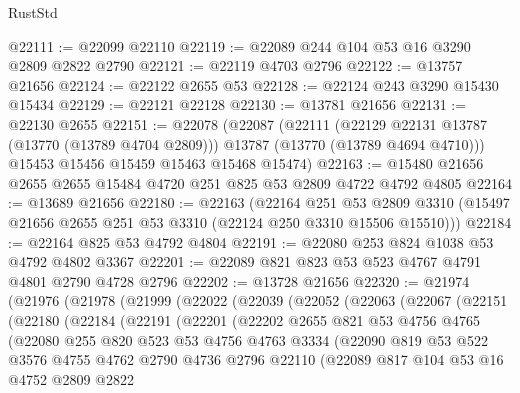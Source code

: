 \begin{lexlean}{RustStd}
\begin{coremodule}
@22111 := @22099 @22110
@22119 := @22089 @244 @104 @53 @16 @3290 @2809 @2822 @2790
@22121 := @22119 @4703 @2796
@22122 := @13757 @21656
@22124 := @22122 @2655 @53
@22128 := @22124 @243 @3290 @15430 @15434
@22129 := @22121 @22128
@22130 := @13781 @21656
@22131 := @22130 @2655
@22151 := @22078
    (@22087
      (@22111
        (@22129 @22131 @13787 (@13770 (@13789 @4704 @2809)))
        @13787
        (@13770 (@13789 @4694 @4710)))
      @15453
      @15456
      @15459
      @15463
      @15468
      @15474)
@22163 := @15480 @21656 @2655 @2655 @15484 @4720 @251 @825 @53 @2809 @4722 @4792 @4805
@22164 := @13689 @21656
@22180 := @22163
    (@22164
      @251
      @53
      @2809
      @3310
      (@15497 @21656 @2655 @251 @53 @3310 (@22124 @250 @3310 @15506 @15510)))
@22184 := @22164 @825 @53 @4792 @4804
@22191 := @22080 @253 @824 @1038 @53 @4792 @4802 @3367
@22201 := @22089 @821 @823 @53 @523 @4767 @4791 @4801 @2790 @4728 @2796
@22202 := @13728 @21656
@22320 := @21974
    (@21976
      (@21978
        (@21999
          (@22022
            (@22039
              (@22052
                (@22063
                  (@22067
                    (@22151
                      (@22180
                        (@22184
                          (@22191
                            (@22201
                              (@22202
                                @2655
                                @821
                                @53
                                @4756
                                @4765
                                (@22080
                                  @255
                                  @820
                                  @523
                                  @53
                                  @4756
                                  @4763
                                  @3334
                                  (@22090
                                    @819
                                    @53
                                    @522
                                    @3576
                                    @4755
                                    @4762
                                    @2790
                                    @4736
                                    @2796
                                    @22110
                                    (@22089
                                      @817
                                      @104
                                      @53
                                      @16
                                      @4752
                                      @2809
                                      @2822

\end{coremodule}
\end{lexlean}
